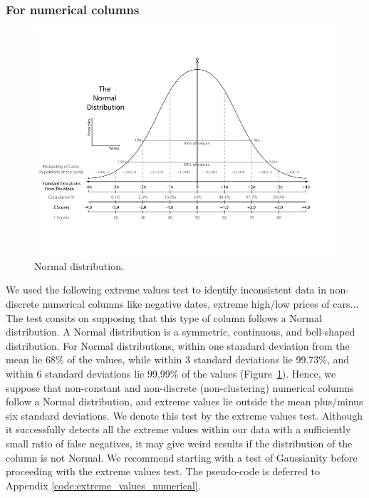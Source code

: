 \documentclass{article}
\begin{document}
\subsubsection{For numerical columns} %
\label{ssub:extreme_value_test}
\begin{figure}[h]
    \centering
    \includegraphics[width=0.6\linewidth]{picture/normal.png}
    \caption{Normal distribution.}
    \label{fig:normal distribution}
\end{figure}
We used the following extreme values test to identify inconsistent data in non-discrete numerical columns like negative dates, extreme high/low prices of cars...
The test consits on supposing that this type of column follows a Normal distribution.
A Normal distribution is a symmetric, continuous, and bell-shaped distribution.
For Normal distributions, within one standard deviation from the mean lie 68\% of the values, while within 3 standard deviations lie 99.73\%, and within 6 standard deviations lie 99,99\% of the values (Figure~\ref{fig:normal distribution}).
Hence, we suppose that non-constant and non-discrete (non-clustering) numerical columns follow a Normal distribution, and extreme values lie outside the mean plus/minus six standard deviations.
We denote this test by the extreme values test.
Although it successfully detects all the extreme values within our data with a sufficiently small ratio of false negatives, it may give weird results if the distribution of the column is not Normal.
We recommend starting with a test of Gaussianity before proceeding with the extreme values test.
The pseudo-code is deferred to Appendix \ref{code:extreme_values_numerical}.
\end{document}
